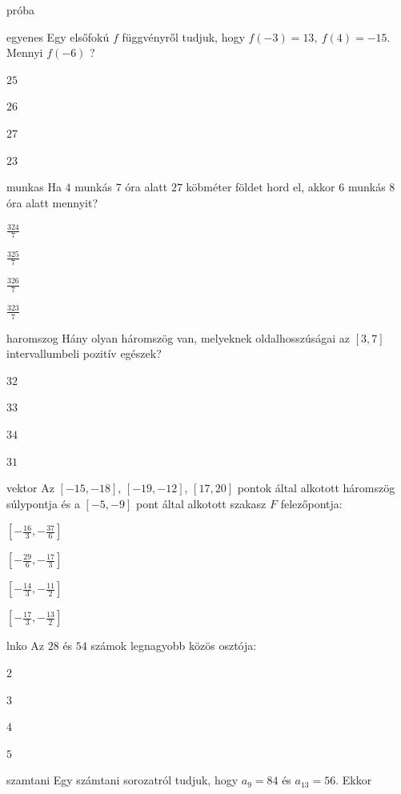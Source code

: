 \documentclass[12pt]{article}
\begin{document}
\begin{quiz}{próba}

\begin{multi}{egyenes}
Egy elsőfokú $f$ függvényről tudjuk, hogy $f(-3)=13,\ f(4)=-15$. Mennyi $f(-6)$ ?
\item* $25$
\item  $26$
\item  $27$
\item  $23$
\end{multi}
\begin{multi}{munkas}
Ha $4$ munkás $7$ óra alatt $27$ köbméter földet hord el, akkor
$6$ munkás $8$ óra alatt mennyit? 

\item* $\frac{324}{7}$
\item  $\frac{325}{7}$
\item  $\frac{326}{7}$
\item  $\frac{323}{7}$
\end{multi}
\begin{multi}{haromszog}
Hány olyan háromszög van, melyeknek oldalhosszúságai az $[3,7]$ 
intervallumbeli pozitív egészek?
\item* $32$
\item  $33$
\item  $34$
\item  $31$
\end{multi}
\begin{multi}{vektor}
Az $\left[-15, -18\right]$, $\left[-19, -12\right]$, $\left[17, 20\right]$ pontok által alkotott háromszög súlypontja és a $\left[-5, -9\right]$ pont 
által alkotott szakasz $F$ felezőpontja:
\item* $\left[-\frac{16}{3}, -\frac{37}{6}\right]$
\item  $\left[-\frac{29}{6}, -\frac{17}{3}\right]$
\item  $\left[-\frac{14}{3}, -\frac{11}{2}\right]$
\item  $\left[-\frac{17}{3}, -\frac{13}{2}\right]$
\end{multi}
\begin{multi}{lnko}
Az $28$ és $54$ számok legnagyobb közös osztója:
\item* $2$
\item  $3$
\item  $4$
\item  $5$
\end{multi}
\begin{multi}{szamtani}
Egy számtani sorozatról tudjuk, hogy $a_{9}=84$ és $a_{13}=56$. Ekkor 

\end{multi}
\end{quiz}
\end{document}
